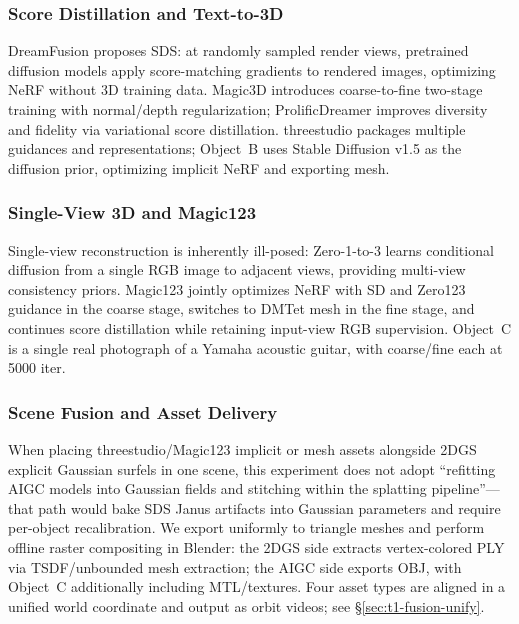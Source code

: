 \documentclass[10pt,twocolumn,letterpaper]{article}
\begin{document}
\subsubsection{Score Distillation and Text-to-3D}

DreamFusion\cite{poole2022dreamfusion} proposes SDS: at randomly sampled render views, pretrained diffusion models apply score-matching gradients to rendered images, optimizing NeRF without 3D training data. Magic3D\cite{lin2023magic3d} introduces coarse-to-fine two-stage training with normal/depth regularization; ProlificDreamer\cite{wang2023prolificdreamer} improves diversity and fidelity via variational score distillation. threestudio\cite{threestudio2023} packages multiple guidances and representations; Object~B uses Stable Diffusion v1.5\cite{rombach2022ldm} as the diffusion prior, optimizing implicit NeRF and exporting mesh.

\subsubsection{Single-View 3D and Magic123}

Single-view reconstruction is inherently ill-posed: Zero-1-to-3\cite{liu2023zero123} learns conditional diffusion from a single RGB image to adjacent views, providing multi-view consistency priors. Magic123\cite{qian2023magic123} jointly optimizes NeRF with SD and Zero123 guidance in the coarse stage, switches to DMTet mesh in the fine stage, and continues score distillation while retaining input-view RGB supervision. Object~C is a single real photograph of a Yamaha acoustic guitar, with coarse/fine each at 5000 iter.

\subsubsection{Scene Fusion and Asset Delivery}

When placing threestudio/Magic123 implicit or mesh assets alongside 2DGS explicit Gaussian surfels in one scene, this experiment does not adopt ``refitting AIGC models into Gaussian fields and stitching within the splatting pipeline''---that path would bake SDS Janus artifacts into Gaussian parameters and require per-object recalibration. We export uniformly to triangle meshes and perform offline raster compositing in Blender: the 2DGS side extracts vertex-colored PLY via TSDF/unbounded mesh extraction; the AIGC side exports OBJ, with Object~C additionally including MTL/textures. Four asset types are aligned in a unified world coordinate and output as orbit videos; see \S\ref{sec:t1-fusion-unify}.
\end{document}
